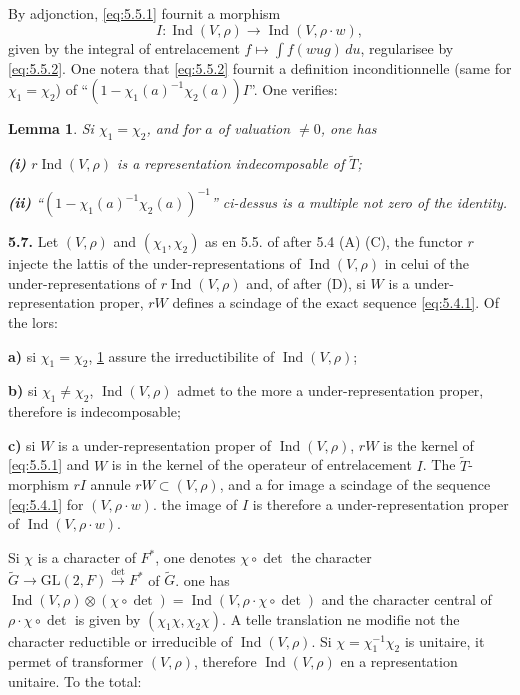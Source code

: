 \documentclass[12pt,a4paper]{article}
\theoremstyle{plain}
\newtheorem{lemma}[theorem]{Lemma}
\theoremstyle{definition}
\theoremstyle{remark}
\DeclareMathOperator{\Ind}{Ind}
\newcommand{\wt}{\widetilde}
\begin{document}
By adjonction, \eqref{eq:5.5.1} fournit a morphism
\begin{equation}\label{eq:5.5.3}
I : \Ind(V, \rho) \longrightarrow \Ind(V, \rho \cdot w),
\tag{5.5.3}
\end{equation}
given by the integral of entrelacement $f \mapsto \int f(wug) \, du$, regularisee by \eqref{eq:5.5.2}. One notera that \eqref{eq:5.5.2} fournit a definition inconditionnelle (same for $\chi_1 = \chi_2$) of ``$(1 - \chi_1(a)^{-1} \chi_2(a)) I$''. One verifies:

\begin{lemma}\label{lem:5.6}
Si $\chi_1 = \chi_2$, and for $a$ of valuation $\neq 0$, one has

\textbf{(i)} $r \Ind(V, \rho)$ is a representation indecomposable of $\wt{T}$;

\textbf{(ii)} ``$(1 - \chi_1(a)^{-1} \chi_2(a))^{-1}$'' ci-dessus is a multiple not zero of the identity.
\end{lemma}

\textbf{5.7.} Let $(V, \rho)$ and $(\chi_1, \chi_2)$ as en 5.5. of after 5.4 (A) (C), the functor $r$ injecte the lattis of the under-representations of $\Ind(V, \rho)$ in celui of the under-representations of $r \Ind(V, \rho)$ and, of after (D), si $W$ is a under-representation proper, $rW$ defines a scindage of the exact sequence \eqref{eq:5.4.1}. Of the lors:

\textbf{a)} si $\chi_1 = \chi_2$, \ref{lem:5.6} assure the irreductibilite of $\Ind(V, \rho)$;

\textbf{b)} si $\chi_1 \neq \chi_2$, $\Ind(V, \rho)$ admet to the more a under-representation proper, therefore is indecomposable;

\textbf{c)} si $W$ is a under-representation proper of $\Ind(V, \rho)$, $rW$ is the kernel of \eqref{eq:5.5.1} and $W$ is in the kernel of the operateur of entrelacement $I$. The $\wt{T}$-morphism $rI$ annule $rW \subset (V, \rho)$, and a for image a scindage of the sequence \eqref{eq:5.4.1} for $(V, \rho \cdot w)$. the image of $I$ is therefore a under-representation proper of $\Ind(V, \rho \cdot w)$.

Si $\chi$ is a character of $F^*$, one denotes $\chi \circ \det$ the character $\wt{G} \to \mathrm{GL}(2, F) \xrightarrow{\det} F^*$ of $\wt{G}$. one has $\Ind(V, \rho) \otimes (\chi \circ \det) = \Ind(V, \rho \cdot \chi \circ \det)$ and the character central of $\rho \cdot \chi \circ \det$ is given by $(\chi_1 \chi, \chi_2 \chi)$. A telle translation ne modifie not the character reductible or irreducible of $\Ind(V, \rho)$. Si $\chi = \chi_1^{-1} \chi_2$ is unitaire, it permet of transformer $(V, \rho)$, therefore $\Ind(V, \rho)$ en a representation unitaire. To the total:
\end{document}
